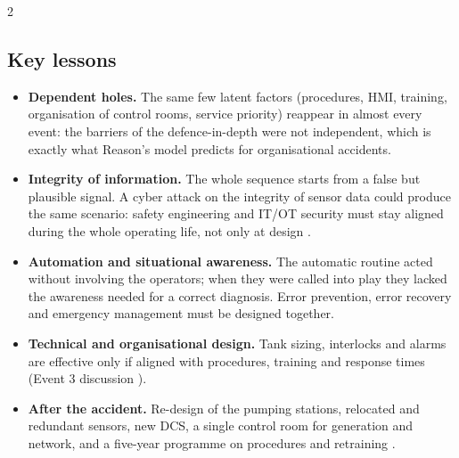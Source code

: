 \begin{multicols}{2}
\subsection{Key lessons}
\begin{itemize}
  \item \textbf{Dependent holes.} The same few latent factors (procedures, HMI, training, organisation of control rooms, service priority) reappear in almost every event: the barriers of the defence-in-depth were not independent, which is exactly what Reason's model predicts for organisational accidents.
  \item \textbf{Integrity of information.} The whole sequence starts from a false but plausible signal. A cyber attack on the integrity of sensor data could produce the same scenario: safety engineering and IT/OT security must stay aligned during the whole operating life, not only at design .
  \item \textbf{Automation and situational awareness.} The automatic routine acted without involving the operators; when they were called into play they lacked the awareness needed for a correct diagnosis. Error prevention, error recovery and emergency management must be designed together.
  \item \textbf{Technical and organisational design.} Tank sizing, interlocks and alarms are effective only if aligned with procedures, training and response times (Event 3 discussion ).
  \item \textbf{After the accident.} Re-design of the pumping stations, relocated and redundant sensors, new DCS, a single control room for generation and network, and a five-year programme on procedures and retraining .
\end{itemize}
\end{multicols}
